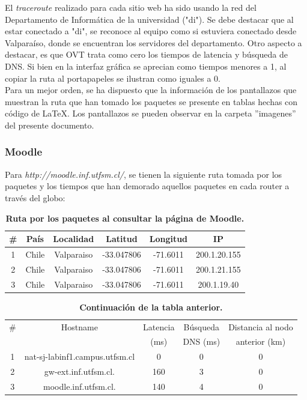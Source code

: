\documentclass[12pt]{article}
\begin{document}
El \emph{traceroute} realizado para cada sitio web ha sido usando la red del Departamento de Informática de la universidad ("di"). Se debe destacar que al estar conectado a "di", se reconoce al equipo como si estuviera conectado desde Valparaíso, donde se encuentran los servidores del departamento. Otro aspecto a destacar, es que OVT trata como cero los tiempos de latencia y búsqueda de DNS. Si bien en la interfaz gráfica se aprecian como tiempos menores a 1, al copiar la ruta al portapapeles se ilustran como iguales a 0.\\

Para un mejor orden, se ha dispuesto que la información de los pantallazos que muestran la ruta que han tomado los paquetes se presente en tablas hechas con código de \LaTeX. Los pantallazos se pueden observar en la carpeta ''imagenes'' del presente documento.

\subsubsection{Moodle}
Para \emph{http://moodle.inf.utfsm.cl/}, se tienen la siguiente ruta tomada por los paquetes y los tiempos que han demorado aquellos paquetes en cada router a través del globo:\\

\begin{table}[H]
\centering
\begin{tabular}{| c | c | c | c | c | c |}
\hline
\# & País & Localidad & Latitud & Longitud & IP\\
\hline
1 & Chile & Valparaiso & -33.047806 & -71.6011 & 200.1.20.155\\
\hline
2 & Chile & Valparaiso & -33.047806 & -71.6011 & 200.1.21.155\\
\hline
3 & Chile & Valparaiso & -33.047806 & -71.6011 & 200.1.19.40\\
\hline
\end{tabular}
\caption{\small \textbf{Ruta por los paquetes al consultar la página de Moodle.}}
\end{table}

\begin{table}[H]
\centering
\begin{tabular}{| c | c | c | c | c |}
\hline
\# & Hostname & Latencia & Búsqueda & Distancia al nodo\\
 &  & (ms) & DNS (ms) & anterior (km)\\
\hline
1 & nat-sj-labinf1.campus.utfsm.cl & 0 & 0 & 0\\
\hline
2 & gw-ext.inf.utfsm.cl. & 160 & 3 & 0\\
\hline
3 & moodle.inf.utfsm.cl. & 140 & 4 & 0\\
\hline
\end{tabular}
\caption{\small \textbf{Continuación de la tabla anterior.}}
\end{table}
\end{document}
